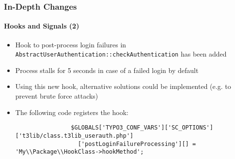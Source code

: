 \begin{frame}[fragile]
	\frametitle{In-Depth Changes}
	\framesubtitle{Hooks and Signals (2)}

	\lstset{basicstyle=\tiny\ttfamily}

	\begin{itemize}

		\item Hook to post-process login failures in \texttt{AbstractUserAuthentication::checkAuthentication}
			has been added

		\item Process stalls for 5 seconds in case of a failed login by default

		\item Using this new hook, alternative solutions could be implemented
			(e.g. to prevent brute force attacks)

		\item The following code registers the hook:

			\begin{lstlisting}
				$GLOBALS['TYPO3_CONF_VARS']['SC_OPTIONS']['t3lib/class.t3lib_userauth.php']
				  ['postLoginFailureProcessing'][] = 'My\\Package\\HookClass->hookMethod';
			\end{lstlisting}

	\end{itemize}

\end{frame}


